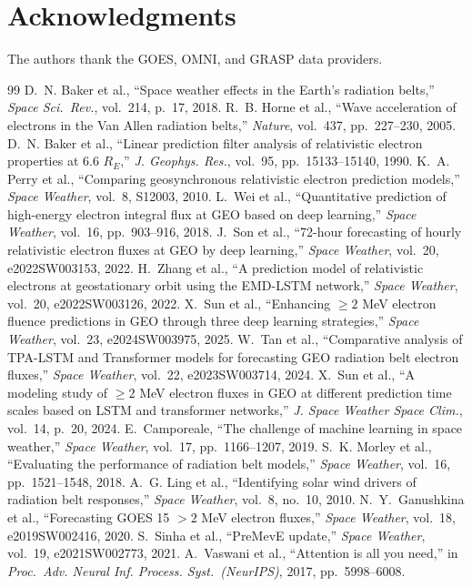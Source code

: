 \documentclass[conference]{IEEEtran}
\begin{document}
\section*{Acknowledgments}
The authors thank the GOES, OMNI, and GRASP data providers.

\begin{thebibliography}{99}
D.~N. Baker et al., ``Space weather effects in the Earth's radiation belts,''
\emph{Space Sci.\ Rev.}, vol.~214, p.~17, 2018.
R.~B. Horne et al., ``Wave acceleration of electrons in the Van Allen
radiation belts,'' \emph{Nature}, vol.~437, pp.~227--230, 2005.
D.~N. Baker et al., ``Linear prediction filter analysis of relativistic
electron properties at 6.6 \(R_E\),'' \emph{J. Geophys. Res.}, vol.~95,
pp.~15133--15140, 1990.
K.~A. Perry et al., ``Comparing geosynchronous relativistic electron
prediction models,'' \emph{Space Weather}, vol.~8, S12003, 2010.
L.~Wei et al., ``Quantitative prediction of high-energy electron integral flux
at GEO based on deep learning,'' \emph{Space Weather}, vol.~16,
pp.~903--916, 2018.
J.~Son et al., ``72-hour forecasting of hourly relativistic electron fluxes at
GEO by deep learning,'' \emph{Space Weather}, vol.~20, e2022SW003153, 2022.
H.~Zhang et al., ``A prediction model of relativistic electrons at
geostationary orbit using the EMD-LSTM network,''
\emph{Space Weather}, vol.~20, e2022SW003126, 2022.
X.~Sun et al., ``Enhancing \(\ge2\) MeV electron fluence predictions in GEO
through three deep learning strategies,'' \emph{Space Weather}, vol.~23,
e2024SW003975, 2025.
W.~Tan et al., ``Comparative analysis of TPA-LSTM and Transformer models
for forecasting GEO radiation belt electron fluxes,'' \emph{Space Weather}, vol.~22, e2023SW003714, 2024.
X.~Sun et al., ``A modeling study of \(\ge2\) MeV electron fluxes in GEO at
different prediction time scales based on LSTM and transformer networks,'' \emph{J. Space Weather Space Clim.},
vol.~14, p.~20, 2024.
E.~Camporeale, ``The challenge of machine learning in space weather,''
\emph{Space Weather}, vol.~17, pp.~1166--1207, 2019.
S.~K. Morley et al., ``Evaluating the performance of radiation belt models,''
\emph{Space Weather}, vol.~16, pp.~1521--1548, 2018.
A.~G. Ling et al., ``Identifying solar wind drivers of radiation belt
responses,'' \emph{Space Weather}, vol.~8, no.~10, 2010.
N.~Y.~Ganushkina et al., ``Forecasting GOES 15 \(>2\) MeV electron fluxes,''
\emph{Space Weather}, vol.~18, e2019SW002416, 2020.
S.~Sinha et al., ``PreMevE update,'' \emph{Space Weather}, vol.~19,
e2021SW002773, 2021.
A.~Vaswani et al., ``Attention is all you need,'' in \emph{Proc.\ Adv. Neural Inf. Process. Syst.\ (NeurIPS)}, 2017,
pp.~5998--6008.
\end{thebibliography}
\end{document}
